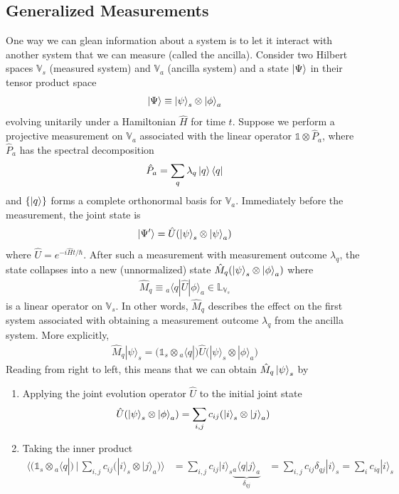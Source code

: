 \documentclass[11pt, answers]{exam}
\theoremstyle{definition}
\theoremstyle{bulleted}
\begin{document}
	\subsection{Generalized Measurements}
	One way we can glean information about a system is to let it interact with another system that we can measure (called the ancilla). Consider two Hilbert spaces $\mathbb{V}_s$ (measured system) and $\mathbb{V}_a$ (ancilla system) and a state $\ket{\Psi}$ in their tensor product space
	\begin{align*}
		\ket{\Psi} \equiv \ket{\psi}_s \otimes \ket{\phi}_a
	\end{align*}
	evolving unitarily under a Hamiltonian $\hat{H}$ for time $t$. Suppose we perform a projective measurement on $\mathbb{V}_a$ associated with the linear operator $\mathds{1}\otimes \hat{P}_a$, where $\hat{P}_a$ has the spectral decomposition
	\begin{align*}
		\hat{P}_a = \sum_q \lambda_q \ket{q}\bra{q}
	\end{align*}
	and $\{\ket{q}\}$ forms a complete orthonormal basis for $\mathbb{V}_a$. Immediately before the measurement, the joint state is
	\begin{align*}
		\ket{\Psi'} = \hat{U}(\ket{\psi}_s \otimes \ket{\psi}_a)
	\end{align*}
	where $\hat{U}=e^{-i\hat{H}t/\hbar}$. After such a measurement with measurement outcome $\lambda_q$, the state collapses into a new (unnormalized) state $\hat{M}_q(\ket{\psi}_s\otimes \ket{\phi}_a)$
	where
	\begin{align*}
		\hat{M}_q \equiv {}_a\langle q | \hat{U} | \phi\rangle_a \in \mathbb{L}_{\mathbb{V}_s}
	\end{align*}
	is a linear operator on $\mathbb{V}_s$. In other words, $\hat{M}_q$ describes the effect on the first system associated with obtaining a measurement outcome $\lambda_q$ from the ancilla system. More explicitly,
	\begin{align*}
		\hat{M}_q|\psi\rangle_s
		=
		\bigl(\mathds{1}_s\otimes{}_a\langle q|\bigr)
		\hat U
		\bigl(|\psi\rangle_s\otimes|\phi\rangle_a\bigr)
	\end{align*}
	Reading from right to left, this means that we can obtain $\hat{M}_q\ket{\psi}_s$ by
	\begin{enumerate}
		\item Applying the joint evolution operator $\hat{U}$ to the initial joint state
		\begin{align*}
			\hat{U}(\ket{\psi}_s\otimes \ket{\phi}_a) = \sum_{i,j} c_{ij}(\ket{i}_s\otimes \ket{j}_a)
		\end{align*}
		\item Taking the inner product
		\[
		\begin{aligned}
			\bigg\langle\bigl(\mathds{1}_s\otimes{}_a\langle q|\bigr)\,\bigg\lvert\,
			\sum_{i,j}c_{ij}\bigl(|i\rangle_s\otimes|j\rangle_a\bigr)\bigg\rangle
			&=\sum_{i,j}c_{ij}|i\rangle_s
			\underbrace{{}_a\langle q|j\rangle_a}_{\delta_{qj}}
			&=\sum_{i,j}c_{ij}\delta_{qj}|i\rangle_s
				=\sum_i c_{iq}|i\rangle_s
		\end{aligned}
		\]
	\end{enumerate}
\end{document}
